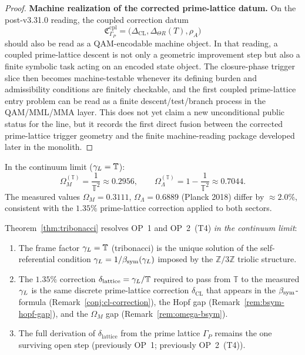 \begin{proof}
\medskip
\noindent\textbf{Machine realization of the corrected prime-lattice datum.}
On the post-v3.31.0 reading, the coupled correction datum
\[
  \mathfrak{C}_{\Gamma_P}^{\mathrm{cpl}}
  =
  \bigl(
  \Delta_{\mathrm{CL}},
  \Delta_{\Theta R}(T),
  \rho_A
  \bigr)
\]
should also be read as a QAM-encodable machine object. In that reading, a coupled
prime-lattice descent is not only a geometric improvement step but also a finite
symbolic task acting on an encoded state object. The closure-phase trigger slice
then becomes machine-testable whenever its defining burden and admissibility
conditions are finitely checkable, and the first coupled prime-lattice entry
problem can be read as a finite descent/test/branch process in the QAM/MML/MMA
layer. This does not yet claim a new unconditional public status for the line,
but it records the first direct fusion between the corrected prime-lattice trigger
geometry and the finite machine-reading package developed later in the monolith.
\end{proof}

\begin{corollary}
\label{cor:tribonacci-cosmo}
In the continuum limit ($\gamma_L = \mathbb{T}$):
\[
  \Omega_M^{(\mathbb{T})} = \frac{1}{\mathbb{T}^2} \approx 0.2956,
  \qquad
  \Omega_\Lambda^{(\mathbb{T})} = 1-\frac{1}{\mathbb{T}^2} \approx 0.7044.
\]
The measured values $\Omega_M = 0.3111$, $\Omega_\Lambda = 0.6889$
(Planck 2018) differ by $\approx 2.0\%$, consistent with the
$1.35\%$ prime-lattice correction applied to both sectors.
\end{corollary}

\begin{remark}[OP~1/OP~2 (T4) resolution]
\label{rem:op1-tribonacci}
Theorem~\ref{thm:tribonacci} resolves OP~1 and OP~2~(T4)
\emph{in the continuum limit}:
\begin{enumerate}[label=(\roman*)]
  \item The frame factor $\gamma_L = \mathbb{T}$ (tribonacci) is
    the unique solution of the self-referential condition
    $\gamma_L = 1/\beta_{\mathrm{sym}}(\gamma_L)$ imposed by the $\mathbb{Z}/3\mathbb{Z}$
    triolic structure.
  \item The $1.35\%$ correction $\delta_{\mathrm{lattice}} = \gamma_L/\mathbb{T}$
    required to pass from $\mathbb{T}$ to the measured $\gamma_L$ is the
    same discrete prime-lattice correction $\delta_{\mathrm{CL}}$ that
    appears in the $\beta_{\mathrm{sym}}$-formula (Remark~\ref{conj:cl-correction}),
    the Hopf gap (Remark~\ref{rem:bsym-hopf-gap}), and the
    $\Omega_M$ gap (Remark~\ref{rem:omega-bsym}).
  \item The full derivation of $\delta_{\mathrm{lattice}}$ from the
    prime lattice $\Gamma_P$ remains the one surviving open step
    (previously OP~1; previously OP~2~(T4)).
\end{enumerate}
\end{remark}

